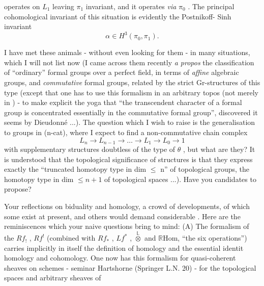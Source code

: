 operates on $L_1$ leaving $\pi_1$ invariant, and it operates \emph{via} $\pi_0$ . The
principal cohomological invariant of this situation is evidently the Postnikoff-%
Sinh invariant
\[ \alpha \in H^3(\pi_0, \pi_1) . \]

I have met these animals - without even looking for them - in many
situations, which I will not list now (I came across them recently \emph{a propos}
the classification of ``ordinary'' formal groups over a perfect field, in terms
of \emph{affine} algebraic groups, and \emph{commutative} formal groups, related by the
strict Gr-structures of this type (except that one has to use this formalism
in an arbitrary topos (not merely in ) - to make explicit the yoga that
``the transcendent character of a formal group is concentrated essentially in
the commutative formal group'', discovered it seems by Dieudonné ...). The
question which I wish to raise is the generalisation to groups in (n-cat),
where I expect to find a non-commutative chain complex
\[ L_n \to L_{n-1} \to \dots \to L_1 \to L_0 \to 1 \]
with supplementary structures doubtless of the type of $\theta$ , but what are they?
It is understood that the topological significance of  structures is that
they express exactly the ``truncated homotopy type in dim $\leq$ n'' of topological
groups,  the homotopy type in dim $\leq n + 1$ of  topological
spaces ...). Have you candidates to propose?
\hand{* * *}

 Your reflections on biduality and homology,  a crowd of
developments, of which  some  exist at present, and others would demand
 considerable . Here are the reminiscences which your naive
questions bring to mind:
(A) The formalism of the $Rf_!$ , $Rf^!$ (combined with $Rf_*$ , $Lf^*$ , $\overset{\mathbb{L}}{\otimes}$ and $\mathbb{R}$Hom,
``the six operations'') carries implicitly in itself the definition of homology
and the essential identit homology and cohomology. One now
has this formalism for quasi-coherent sheaves on schemes - seminar Hartshorne
(Springer L.N. 20) - for the topological spaces and arbitrary sheaves of
